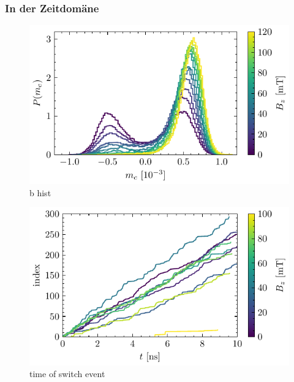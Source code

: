 \documentclass[main.tex]{subfiles}
\begin{document}

\subsubsection{In der Zeitdomäne}


\begin{figure}[H]
    \centering
    \includegraphics{bilder/plots/max_Bz/mc_hist.pdf}
    \caption{b hist}\label{fig:b-hist}    
\end{figure}

\begin{figure}[H]
    \centering
    \includegraphics{bilder/plots/max_Bz/switch_events.pdf}
    \caption{time of switch event}\label{fig:bz-switch-events}   
\end{figure}
\end{document}

